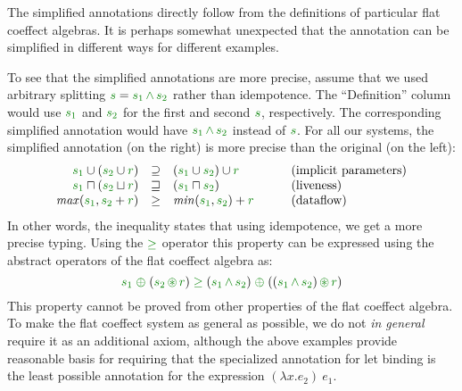 The simplified annotations directly follow from the definitions of particular flat coeffect
algebras. It is perhaps somewhat unexpected that the annotation can be simplified in different
ways for different examples.

To see that the simplified annotations are more precise, assume that we used arbitrary
splitting $\cclrd{s} = \cclrd{s_1}\,\czip\,\cclrd{s_2}$ rather than idempotence. The
``Definition'' column would use $\cclrd{s_1}$ and $\cclrd{s_2}$ for the first and second
$\cclrd{s}$, respectively. The corresponding simplified annotation would have
$\cclrd{s_1}\,\czip\,\cclrd{s_2}$ instead of $\cclrd{s}$. For all our systems, the
simplified annotation (on the right) is more precise than the original (on the left):
%
\begin{equation*}
\begin{array}{rclll}
\cclrd{s_1} \cup (\cclrd{s_2} \cup \cclrd{r}) &\supseteq& (\cclrd{s_1} \cup \cclrd{s_2}) \cup \cclrd{r}
  && \textnormal{(implicit parameters)}\\
\cclrd{s_1} \sqcap (\cclrd{s_2} \sqcup \cclrd{r}) &\sqsupseteq&  (\cclrd{s_1} \sqcap \cclrd{s_2})
  && \textnormal{(liveness)} \\
\mathit{max}(\cclrd{s_1}, \cclrd{s_2} + \cclrd{r}) &\geq& \mathit{min}(\cclrd{s_1}, \cclrd{s_2}) + \cclrd{r}
  &\quad& \textnormal{(dataflow)} \\
\end{array}
\end{equation*}
%
In other words, the inequality states that using idempotence, we get a more precise typing.
Using the $\cgeq$ operator this property can be expressed using the abstract operators of the flat coeffect algebra as:
%
\begin{equation*}
\cclrd{s_1} \;\cpar\; (\cclrd{s_2} \,\cseq\, \cclrd{r}) \;\cgeq\;
  (\cclrd{s_1} \,\czip\, \cclrd{s_2}) \;\cpar\; ((\cclrd{s_1} \,\czip\, \cclrd{s_2}) \,\cseq\, \cclrd{r})
\end{equation*}
%
This property cannot be proved from other properties of the flat coeffect algebra. To make
the flat coeffect system as general as possible, we do not \emph{in general} require it as
an additional axiom, although the above examples provide reasonable basis for requiring
that the specialized annotation for let binding is the least possible annotation for the
expression $(\lambda x.e_2)~e_1$.


